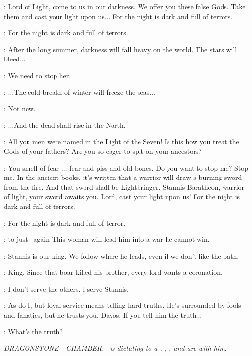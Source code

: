 \MELISANDRE: Lord of Light, come to us in our darkness. We offer you these false Gods. Take them and cast your light upon us$\ldots$ For the night is dark and full of terrors.

\CROWD: For the night is dark and full of terrors.

\MELISANDRE: After the long summer, darkness will fall heavy on the world. The stars will bleed$\ldots$

\CRESSEN:  We need to stop her.

\MELISANDRE: $\ldots$The cold breath of winter will freeze the seas$\ldots$

\DAVOS: Not now.

\MELISANDRE: $\ldots$And the dead shall rise in the North.

\CRESSEN:  All you men were named in the Light of the Seven! Is this how you treat the Gods of your fathers? Are you so eager to spit on your ancestors?

\MELISANDRE: You smell of fear $\ldots$ fear and piss and old bones. Do you want to stop me? Stop me. In the ancient books, it's written that a warrior will draw a burning sword from the fire. And that sword shall be Lightbringer. Stannis Baratheon, warrior of light, your sword awaits you.  Lord, cast your light upon us! For the night is dark and full of terrors.

\STANNIS: For the night is dark and full of terror.

\CRESSEN: {to just \DAVOS ~again} This woman will lead him into a war he cannot win.

\DAVOS: Stannis is our king. We follow where he leads, even if we don't like the path.

\CRESSEN: King. Since that boar killed his brother, every lord wants a coronation.

\DAVOS: I don't serve the others. I serve Stannis.

\CRESSEN: As do I, but loyal service means telling hard truths. He's surrounded by fools and fanatics, but he trusts you, Davos. If you tell him the truth$\ldots$

\DAVOS: What's the truth?


\scene

\textit{DRAGONSTONE - CHAMBER.  \STANNIS ~is dictating to a \MATTHOS.  \DAVOS, \MELISANDRE, and \CRESSEN are with him.}

